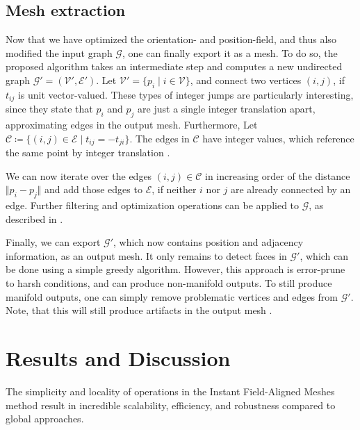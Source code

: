 \documentclass{ACGSeminar}
\begin{document}
\subsection{Mesh extraction}
Now that we have optimized the orientation- and position-field, and thus also modified the input graph $\mathcal{G}$, one can finally export it as a mesh. To do so, the proposed algorithm takes an intermediate step and computes a new undirected graph $\mathcal{G}' = (\mathcal{V}', \mathcal{E}')$. Let $\mathcal{V}' = \{p_i \mid i \in \mathcal{V}\}$, and connect two vertices $(i,j)$, if $t_{ij}$ is unit vector-valued. These types of integer jumps are particularly interesting, since they state that $p_i$ and $p_j$ are just a single integer translation apart, approximating edges in the output mesh. Furthermore, Let $\mathcal{C} \coloneqq \{(i,j) \in \mathcal{E} \mid t_{ij} = - t_{ji}\}$. The edges in $\mathcal{C}$ have integer values, which reference the same point by integer translation \cite{jakob2015instant}.\bigskip

We can now iterate over the edges $(i,j) \in \mathcal{C}$ in increasing order of the distance $\Vert p_i - p_j \Vert$ and add those edges to $\mathcal{E}$, if neither $i$ nor $j$ are already connected by an edge. Further filtering and optimization operations can be applied to $\mathcal{G}$, as described in \cite{jakob2015instant}.

Finally, we can export $\mathcal{G}'$, which now contains position and adjacency information, as an output mesh. It only remains to detect faces in $\mathcal{G}'$, which can be done using a simple greedy algorithm. However, this approach is error-prune to harsh conditions, and can produce non-manifold outputs. To still produce manifold outputs, one can simply remove problematic vertices and edges from $\mathcal{G}'$. Note, that this will still produce artifacts in the output mesh \cite{jakob2015instant}.

\section{Results and Discussion}
The simplicity and locality of operations in the Instant Field-Aligned Meshes method result in incredible scalability, efficiency, and robustness compared to global approaches.
\end{document}
